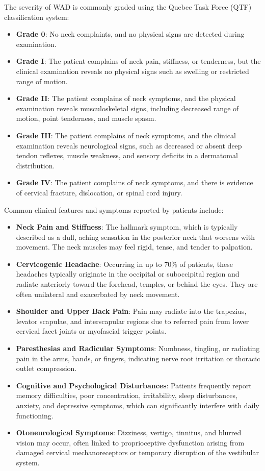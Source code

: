 The severity of WAD is commonly graded using the Quebec Task Force (QTF) classification system:
\begin{itemize}
    \item \textbf{Grade 0}: No neck complaints, and no physical signs are detected during examination.
    \item \textbf{Grade I}: The patient complains of neck pain, stiffness, or tenderness, but the clinical examination reveals no physical signs such as swelling or restricted range of motion.
    \item \textbf{Grade II}: The patient complains of neck symptoms, and the physical examination reveals musculoskeletal signs, including decreased range of motion, point tenderness, and muscle spasm.
    \item \textbf{Grade III}: The patient complains of neck symptoms, and the clinical examination reveals neurological signs, such as decreased or absent deep tendon reflexes, muscle weakness, and sensory deficits in a dermatomal distribution.
    \item \textbf{Grade IV}: The patient complains of neck symptoms, and there is evidence of cervical fracture, dislocation, or spinal cord injury.
\end{itemize}

Common clinical features and symptoms reported by patients include:
\begin{itemize}
    \item \textbf{Neck Pain and Stiffness}: The hallmark symptom, which is typically described as a dull, aching sensation in the posterior neck that worsens with movement. The neck muscles may feel rigid, tense, and tender to palpation.
    \item \textbf{Cervicogenic Headache}: Occurring in up to 70\% of patients, these headaches typically originate in the occipital or suboccipital region and radiate anteriorly toward the forehead, temples, or behind the eyes. They are often unilateral and exacerbated by neck movement.
    \item \textbf{Shoulder and Upper Back Pain}: Pain may radiate into the trapezius, levator scapulae, and interscapular regions due to referred pain from lower cervical facet joints or myofascial trigger points.
    \item \textbf{Paresthesias and Radicular Symptoms}: Numbness, tingling, or radiating pain in the arms, hands, or fingers, indicating nerve root irritation or thoracic outlet compression.
    \item \textbf{Cognitive and Psychological Disturbances}: Patients frequently report memory difficulties, poor concentration, irritability, sleep disturbances, anxiety, and depressive symptoms, which can significantly interfere with daily functioning.
    \item \textbf{Otoneurological Symptoms}: Dizziness, vertigo, tinnitus, and blurred vision may occur, often linked to proprioceptive dysfunction arising from damaged cervical mechanoreceptors or temporary disruption of the vestibular system.
\end{itemize}

